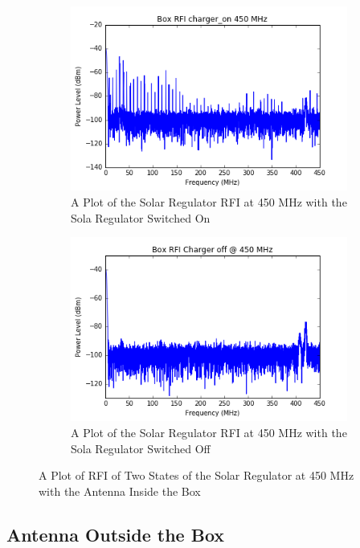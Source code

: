 \documentclass[12pt,a4paper]{report}
\begin{document}
\begin{figure}[!htb]
	\centering
	\begin{subfigure}{.5\textwidth}
		\centering
		\includegraphics[width=.9\linewidth]{Figures/box_rfi_charger_on_450mhz.png}
		\caption{A Plot of the Solar Regulator RFI at 450 MHz with the Sola Regulator Switched On}
		\label{Fig:450on}
	\end{subfigure}%
	\begin{subfigure}{.5\textwidth}
		\centering
		\includegraphics[width=.9\linewidth]{Figures/box_rfi_charger_off_450mhz.png}
		\caption{A Plot of the Solar Regulator RFI at 450 MHz with the Sola Regulator Switched Off}
		\label{Fig:450off}
	\end{subfigure}
	\caption{A Plot of RFI of Two States of the Solar Regulator at 450 MHz with the Antenna Inside the Box}
	\label{Fig:3}
\end{figure}

\newpage
\subsection{Antenna Outside the Box}
\end{document}
